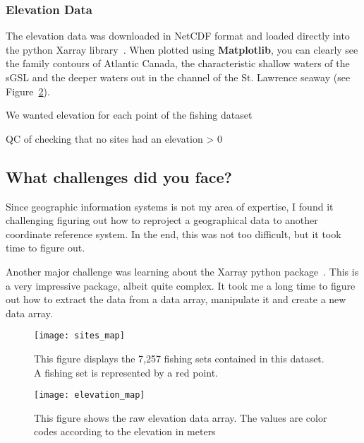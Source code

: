 \subsubsection{Elevation Data}

The elevation data was downloaded in NetCDF format and loaded directly into the python Xarray library~\cite{xarray}.
When plotted using \textbf{Matplotlib}, you can clearly see the family contours of Atlantic Canada, the characteristic
shallow waters of the sGSL and the deeper waters out in the channel of the St. Lawrence seaway (see Figure~\ref{fig:elevation_map}).

We wanted elevation for each point of the fishing dataset


QC of checking that no sites had an elevation > 0






\subsection{What challenges did you face?}

Since geographic information systems is not my area of expertise, I found it challenging figuring out how to reproject a geographical data to another
coordinate reference system.
In the end, this was not too difficult, but it took time to figure out.

Another major challenge was learning about the Xarray python package~\cite{xarray}.
This is a very impressive package, albeit quite complex.
It took me a long time to figure out how to extract the data from a data array, manipulate it and create a new data array.


\begin{figure}
    \texttt{[image: sites\_map]}
    \caption{This figure displays the 7,257 fishing sets contained in this dataset. A fishing set is represented by a red point.}
    \label{fig:set_map}
\end{figure}


\begin{figure}
    \texttt{[image: elevation\_map]}
    \caption{This figure shows the raw elevation data array. The values are color codes according to the elevation in meters}
    \label{fig:elevation_map}
\end{figure}
